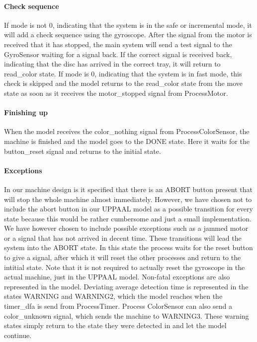 \documentclass[a4paper,oneside,11pt]{article}
\begin{document}
\paragraph{Check sequence}
If mode is not 0, indicating that the system is in the safe or incremental mode, it will add a check sequence using the gyroscope. After the signal from the motor is received that it has stopped, the main system will send a test signal to the GyroSensor waiting for a signal back. If the correct signal is received back, indicating that the disc has arrived in the correct tray, it will return to read\_color state. If mode is 0, indicating that the system is in fast mode, this check is skipped and the model returns to the read\_color state from the move state as soon as it receives the motor\_stopped signal from ProcessMotor.

\paragraph{Finishing up}
When the model receives the color\_nothing signal from ProcessColorSensor, the machine is finished and the model goes to the DONE state. Here it waits for the button\_reset signal and returns to the initial state.

\paragraph{Exceptions}
In our machine design is it specified that there is an ABORT button present that will stop the whole machine almost immediately. However, we have chosen not to include the abort button in our UPPAAL model as a possible transition for every state because this would be rather cumbersome and just a small implementation. We have however chosen to include possible exceptions such as a jammed motor or a signal that has not arrived in decent time. These transitions will lead the system into the ABORT state. In this state the process waits for the reset button to give a signal, after which it will reset the other processes and return to the intitial state. Note that it is not required to actually reset the gyroscope in the actual machine, just in the UPPAAL model. Non-fatal exceptions are also represented in the model. Deviating average detection time is represented in the states WARNING and WARNING2, which the model reaches when the timer\_dfa is send from ProcessTimer. Process ColorSensor can also send a color\_unknown signal, which sends the machine to WARNING3. These warning states simply return to the state they were detected in and let the model continue.
\end{document}
